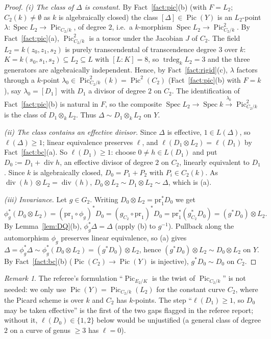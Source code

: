 \documentclass[11pt]{amsart}
\theoremstyle{definition}
\theoremstyle{remark}
\newtheorem{remark}[theorem]{Remark}
\newcommand{\tr}{\operatorname{trdeg}}
\newcommand{\Pic}{\operatorname{Pic}}
\newcommand{\Spec}{\operatorname{Spec}}
\newcommand{\divv}{\operatorname{div}}
\begin{document}
\begin{proof}
\emph{(i) The class of $\Delta$ is constant.} By Fact~\ref{fact:pic}(b) (with $F=L_2$;
$C_2(k)\ne\emptyset$ as $k$ is algebraically closed) the class $[\Delta]\in\Pic(Y)$ is an
$L_2$-point $\lambda\colon\Spec L_2\to\Pic_{C_2/k}$, of degree $2$, i.e.\ a $k$-morphism
$\Spec L_2\to\Pic^2_{C_2/k}$. By Fact~\ref{fact:pic}(a), $\Pic^2_{C_2/k}$ is a torsor
under the Jacobian $J$ of $C_2$. The field $L_2=k(z_0,z_1,s_2)$ is purely transcendental
of transcendence degree $3$ over $k$: $K=k(s_0,s_1,s_2)\subseteq L_2\subseteq L$ with
$[L:K]=8$, so $\tr_kL_2=3$ and the three generators are algebraically independent.
Hence, by Fact~\ref{fact:rigid}(c), $\lambda$ factors through a $k$-point
$\lambda_0\in\Pic^2_{C_2/k}(k)=\Pic^2(C_2)$ (Fact~\ref{fact:pic}(b) with $F=k$), say
$\lambda_0=[D_1]$ with $D_1$ a divisor of degree $2$ on $C_2$. The identification of
Fact~\ref{fact:pic}(b) is natural in $F$, so the composite
$\Spec L_2\to\Spec k\xrightarrow{\lambda_0}\Pic^2_{C_2/k}$ is the class of
$D_1\otimes_kL_2$. Thus $\Delta\sim D_1\otimes_kL_2$ on $Y$.

\emph{(ii) The class contains an effective divisor.} Since $\Delta$ is effective,
$1\in L(\Delta)$, so $\ell(\Delta)\ge1$; linear equivalence preserves $\ell$, and
$\ell(D_1\otimes L_2)=\ell(D_1)$ by Fact~\ref{fact:bc}(a). So $\ell(D_1)\ge1$: choose
$0\ne h\in L(D_1)$ and put $D_0:=D_1+\divv h$, an effective divisor of degree $2$ on
$C_2$, linearly equivalent to $D_1$. Since $k$ is algebraically closed, $D_0=P_1+P_2$
with $P_i\in C_2(k)$. As $\divv(h)\otimes L_2=\divv(h)$, $D_0\otimes L_2\sim D_1\otimes L_2\sim\Delta$,
which is (a).

\emph{(iii) Invariance.} Let $g\in G_2$. Writing $D_0\otimes L_2=\mathrm{pr}_1^*D_0$ we get
\[
\phi_g^*(D_0\otimes L_2)=(\mathrm{pr}_1\circ\phi_g)^*D_0=(g_{C_2}\circ\mathrm{pr}_1)^*D_0
=\mathrm{pr}_1^*(g_{C_2}^*D_0)=(g^*D_0)\otimes L_2 .
\]
By Lemma~\ref{lem:DQ}(b), $\phi_g^*\Delta=\Delta$ (apply (b) to $g^{-1}$). Pullback along
the automorphism $\phi_g$ preserves linear equivalence, so (a) gives
$\Delta=\phi_g^*\Delta\sim\phi_g^*(D_0\otimes L_2)=(g^*D_0)\otimes L_2$, hence
$(g^*D_0)\otimes L_2\sim D_0\otimes L_2$ on $Y$. By Fact~\ref{fact:bc}(b) ($\Pic(C_2)\to\Pic(Y)$
is injective), $g^*D_0\sim D_0$ on $C_2$.
\end{proof}

\begin{remark}
The referee's formulation ``$\Pic_{E_2/K}$ is the twist of $\Pic_{C_2/k}$'' is not needed:
we only use $\Pic(Y)=\Pic_{C_2/k}(L_2)$ for the constant curve $C_2$, where the Picard
scheme is over $k$ and $C_2$ has $k$-points. The step ``$\ell(D_1)\ge1$, so $D_0$ may be
taken effective'' is the first of the two gaps flagged in the referee report; without it,
$\ell(D_0)\in\{1,2\}$ below would be unjustified (a general class of degree $2$ on a curve
of genus $\ge3$ has $\ell=0$).
\end{remark}
\end{document}
